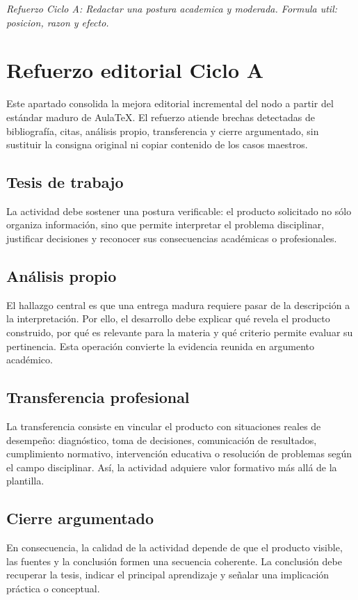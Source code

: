 \documentclass[
	spanish,
	letterpaper, oneside
]{article}
\begin{document}
\textit{Refuerzo Ciclo A: Redactar una postura academica y moderada. Formula util: posicion, razon y efecto.}


\section*{Refuerzo editorial Ciclo A}
Este apartado consolida la mejora editorial incremental del nodo a partir del estándar maduro de AulaTeX. El refuerzo atiende brechas detectadas de bibliografía, citas, análisis propio, transferencia y cierre argumentado, sin sustituir la consigna original ni copiar contenido de los casos maestros.

\subsection*{Tesis de trabajo}
La actividad debe sostener una postura verificable: el producto solicitado no sólo organiza información, sino que permite interpretar el problema disciplinar, justificar decisiones y reconocer sus consecuencias académicas o profesionales.

\subsection*{Análisis propio}
El hallazgo central es que una entrega madura requiere pasar de la descripción a la interpretación. Por ello, el desarrollo debe explicar qué revela el producto construido, por qué es relevante para la materia y qué criterio permite evaluar su pertinencia. Esta operación convierte la evidencia reunida en argumento académico.

\subsection*{Transferencia profesional}
La transferencia consiste en vincular el producto con situaciones reales de desempeño: diagnóstico, toma de decisiones, comunicación de resultados, cumplimiento normativo, intervención educativa o resolución de problemas según el campo disciplinar. Así, la actividad adquiere valor formativo más allá de la plantilla.

\subsection*{Cierre argumentado}
En consecuencia, la calidad de la actividad depende de que el producto visible, las fuentes y la conclusión formen una secuencia coherente. La conclusión debe recuperar la tesis, indicar el principal aprendizaje y señalar una implicación práctica o conceptual.
\end{document}
